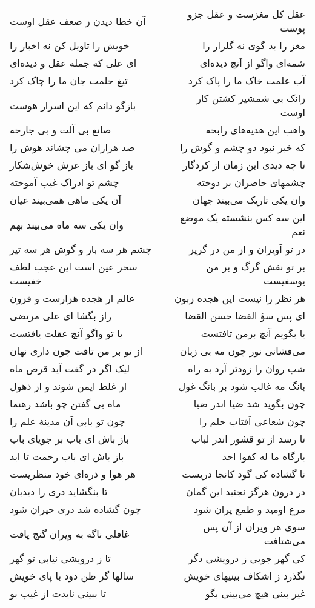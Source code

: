\begin{center}
\begin{longtable}{l p{0.5cm} r}
\\
آن خطا دیدن ز ضعف عقل اوست
&&
عقل کل مغزست و عقل جزو پوست
\\
خویش را تاویل کن نه اخبار را
&&
مغز را بد گوی نه گلزار را
\\
ای علی که جمله عقل و دیده‌ای
&&
شمه‌ای واگو از آنچ دیده‌ای
\\
تیغ حلمت جان ما را چاک کرد
&&
آب علمت خاک ما را پاک کرد
\\
بازگو دانم که این اسرار هوست
&&
زانک بی شمشیر کشتن کار اوست
\\
صانع بی آلت و بی جارحه
&&
واهب این هدیه‌های رابحه
\\
صد هزاران می چشاند هوش را
&&
که خبر نبود دو چشم و گوش را
\\
باز گو ای باز عرش خوش‌شکار
&&
تا چه دیدی این زمان از کردگار
\\
چشم تو ادراک غیب آموخته
&&
چشمهای حاضران بر دوخته
\\
آن یکی ماهی همی‌بیند عیان
&&
وان یکی تاریک می‌بیند جهان
\\
وان یکی سه ماه می‌بیند بهم
&&
این سه کس بنشسته یک موضع نعم
\\
چشم هر سه باز و گوش هر سه تیز
&&
در تو آویزان و از من در گریز
\\
سحر عین است این عجب لطف خفیست
&&
بر تو نقش گرگ و بر من یوسفیست
\\
عالم ار هجده هزارست و فزون
&&
هر نظر را نیست این هجده زبون
\\
راز بگشا ای علی مرتضی
&&
ای پس سؤ القضا حسن القضا
\\
یا تو واگو آنچ عقلت یافتست
&&
یا بگویم آنچ برمن تافتست
\\
از تو بر من تافت چون داری نهان
&&
می‌فشانی نور چون مه بی زبان
\\
لیک اگر در گفت آید قرص ماه
&&
شب روان را زودتر آرد به راه
\\
از غلط ایمن شوند و از ذهول
&&
بانگ مه غالب شود بر بانگ غول
\\
ماه بی گفتن چو باشد رهنما
&&
چون بگوید شد ضیا اندر ضیا
\\
چون تو بابی آن مدینهٔ علم را
&&
چون شعاعی آفتاب حلم را
\\
باز باش ای باب بر جویای باب
&&
تا رسد از تو قشور اندر لباب
\\
باز باش ای باب رحمت تا ابد
&&
بارگاه ما له کفوا احد
\\
هر هوا و ذره‌ای خود منظریست
&&
نا گشاده کی گود کانجا دریست
\\
تا بنگشاید دری را دیدبان
&&
در درون هرگز نجنبد این گمان
\\
چون گشاده شد دری حیران شود
&&
مرغ اومید و طمع پران شود
\\
غافلی ناگه به ویران گنج یافت
&&
سوی هر ویران از آن پس می‌شتافت
\\
تا ز درویشی نیابی تو گهر
&&
کی گهر جویی ز درویشی دگر
\\
سالها گر ظن دود با پای خویش
&&
نگذرد ز اشکاف بینیهای خویش
\\
تا ببینی نایدت از غیب بو
&&
غیر بینی هیچ می‌بینی بگو
\\
\end{longtable}
\end{center}
